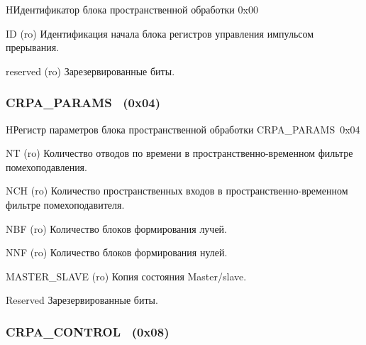 \begin{register}{H}{Идентификатор блока пространственной обработки \regnam}{0x00}
\label{reginterruptcontrol}%
%
%
\regnewline%

\begin{regdesc}\begin{reglist}
\item [ID (ro)]
Идентификация начала блока регистров управления импульсом прерывания.
\item [reserved (ro)]
Зарезервированные биты.
\end{reglist}\end{regdesc}
\end{register}


\subsubsection{CRPA\_PARAMS~ (0x04)}
\renewcommand{\regnam}{CRPA\_PARAMS~}
\label{sec:CRPA_PARAMS}

\begin{register}{H}{Регистр параметров блока пространственной обработки \regnam}{0x04}
\label{reginterruptperiod}%
%
%
%
%
%
%
\regnewline%

\begin{regdesc}\begin{reglist}
\item [NT (ro)]
Количество отводов по времени в пространственно-временном фильтре помехоподавления.
\item [NCH (ro)]
Количество пространственных входов в пространственно-временном фильтре помехоподавителя.
\item [NBF (ro)]
Количество блоков формирования лучей.
\item [NNF (ro)]
Количество блоков формирования нулей.
\item [MASTER\_SLAVE (ro)]
Копия состояния Master/slave.
\item [Reserved]
Зарезервированные биты.
\end{reglist}\end{regdesc}
\end{register}


\subsubsection{CRPA\_CONTROL~ (0x08)}
\renewcommand{\regnam}{CRPA\_CONTROL~}
\label{sec:CRPA_CONTROL}

